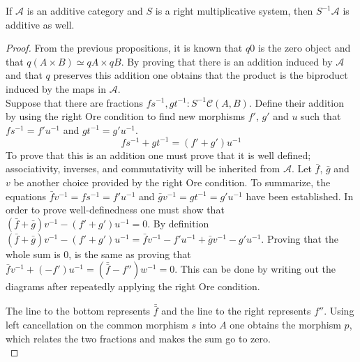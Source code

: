     \begin{prop}
        If $\mathcal{A}$ is an additive category and $S$ is a right multiplicative system, then $S^{-1}\mathcal{A}$ is additive as well.
    \end{prop}

    \begin{proof}
        From the previous propositions, it is known that $q0$ is the zero object and that $q(A\times B)\simeq qA\times qB$. By proving that there is an addition induced by $\mathcal{A}$ and that $q$ preserves this addition one obtains that the product is the biproduct induced by the maps in $\mathcal{A}$. \\

        Suppose that there are fractions $fs^{-1}, gt^{-1}:S^{-1}\mathcal{C}(A,B)$. Define their addition by using the right Ore condition to find new morphisms $f'$, $g'$ and $u$ such that $fs^{-1} = f'u^{-1}$ and $gt^{-1} = g'u^{-1}$.
        \begin{equation*}
            fs^{-1}+gt^{-1} = (f'+g')u^{-1}
        \end{equation*}
        To prove that this is an addition one must prove that it is well defined; associativity, inverses, and commutativity will be inherited from $\mathcal{A}$.
        Let $\bar{f}$, $\bar{g}$ and $v$ be another choice provided by the right Ore condition. To summarize, the equations $\bar{f}v^{-1}=fs^{-1}=f'u^{-1}$ and $\bar{g}v^{-1}=gt^{-1}=g'u^{-1}$ have been established. In order to prove well-definedness one must show that $(\bar{f}+\bar{g})v^{-1}-(f'+g')u^{-1}=0$. By definition $(\bar{f}+\bar{g})v^{-1}-(f'+g')u^{-1}=\bar{f}v^{-1}-f'u^{-1}+\bar{g}v^{-1}-g'u^{-1}$. Proving that the whole sum is $0$, is the same as proving that $\bar{f}v^{-1}+(-f')u^{-1}=(\bar{\bar{f}}-f'')w^{-1}=0$. This can be done by writing out the diagrams after repeatedly applying the right Ore condition.
        \begin{center}
        \end{center}
        The line to the bottom represents $\bar{\bar{f}}$ and the line to the right represents $f''$. Using left cancellation on the common morphism $s$ into $A$ one obtains the morphism $p$, which relates the two fractions and makes the sum go to zero. \\


\end{proof}
